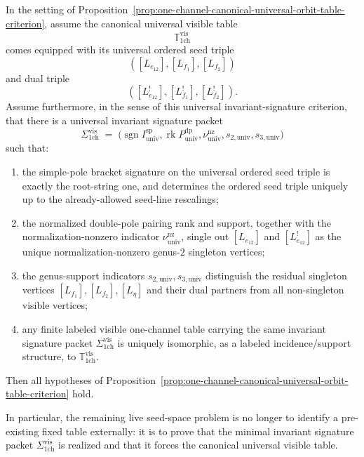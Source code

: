 \begin{proposition}\label{prop:one-channel-universal-invariant-signature-criterion}
In the setting of
Proposition~\textup{\ref{prop:one-channel-canonical-universal-orbit-table-criterion}},
assume the canonical universal visible table
\[
\mathbb{T}_{\mathrm{1ch}}^{\mathrm{vis}}
\]
comes equipped with its universal ordered seed triple
\[
([L_{e_{12}}],[L_{f_1}],[L_{f_2}])
\]
and dual triple
\[
([L_{e_{12}}^!],[L_{f_1}^!],[L_{f_2}^!]).
\]
Assume furthermore, in the sense of this universal invariant-signature
criterion, that there is a universal invariant signature packet
\[
\Sigma_{\mathrm{1ch}}^{\mathrm{vis}}
\;=\;
\bigl(
\operatorname{sgn} I^{\mathrm{sp}}_{\mathrm{univ}},
\operatorname{rk} P^{\mathrm{dp}}_{\mathrm{univ}},
\nu^{\mathrm{nz}}_{\mathrm{univ}},
s_{2,\mathrm{univ}},
s_{3,\mathrm{univ}}
\bigr)
\]
such that:
\begin{enumerate}[label=\textup{(\roman*)}]
\item the simple-pole bracket signature on the universal ordered seed
  triple is exactly the root-string one, and determines the ordered
  seed triple uniquely up to the already-allowed seed-line rescalings;
\item the normalized double-pole pairing rank and support, together
  with the normalization-nonzero indicator
  $\nu^{\mathrm{nz}}_{\mathrm{univ}}$, single out
  $[L_{e_{12}}]$ and $[L_{e_{12}}^!]$ as the unique normalization-nonzero
  genus-$2$ singleton vertices;
\item the genus-support indicators
  $s_{2,\mathrm{univ}}, s_{3,\mathrm{univ}}$
  distinguish the residual singleton vertices
  $[L_{f_1}], [L_{f_2}], [L_{\eta}]$ and their dual partners from all
  non-singleton visible vertices;
\item any finite labeled visible one-channel table carrying the same
  invariant signature packet
  $\Sigma_{\mathrm{1ch}}^{\mathrm{vis}}$
  is uniquely isomorphic, as a labeled incidence/support structure, to
  $\mathbb{T}_{\mathrm{1ch}}^{\mathrm{vis}}$.
\end{enumerate}
Then all hypotheses of
Proposition~\ref{prop:one-channel-canonical-universal-orbit-table-criterion}
hold.

In particular, the remaining live seed-space problem is no longer to
identify a pre-existing fixed table externally: it is to prove that the
minimal invariant signature packet
$\Sigma_{\mathrm{1ch}}^{\mathrm{vis}}$
is realized and that it forces the canonical universal visible table.
\end{proposition}

